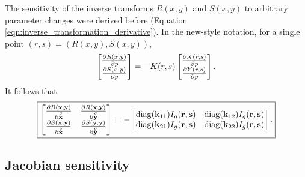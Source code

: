 The sensitivity of the inverse transforms $R(x,y)$ and $S(x,y)$ to arbitrary parameter changes were derived before (Equation \ref{eqn:inverse_transformation_derivative}).  In the new-style notation, for a single point $(r,s) = (R(x,y), S(x,y))$,
%
\begin{equation}
\begin{bmatrix} \frac{\partial{R(x,y)}}{\partial{p}} \\ \frac{\partial{S(x,y)}}{\partial{p}} \end{bmatrix}
=
-K(r,s)
\begin{bmatrix}
\frac{\partial{X(r,s)}}{\partial{p}} \\ \frac{\partial{Y(r,s)}}{\partial{p}}
\end{bmatrix}.
\end{equation}
%
It follows that
%
\begin{equation}
\label{eqn:rs_sensitivity}
\boxed{
\begin{bmatrix}
\pp{R(\ve x,\ve y)}{\g{\ve x}} & \pp{R(\ve x,\ve y)}{\g{\ve y}} \\
\pp{S(\ve x,\ve y)}{\g{\ve x}} & \pp{S(\ve y,\ve y)}{\g{\ve y}}
\end{bmatrix}
=
-\begin{bmatrix}
\operatorname{diag}(\ve{k}_{11}) I_g(\ve r, \ve s) & \operatorname{diag}(\ve{k}_{12}) I_g(\ve r, \ve s) \\
\operatorname{diag}(\ve{k}_{21}) I_g(\ve r, \ve s) & \operatorname{diag}(\ve{k}_{22}) I_g(\ve r, \ve s)
\end{bmatrix}.
}%
\end{equation}

\subsection{Jacobian sensitivity}

